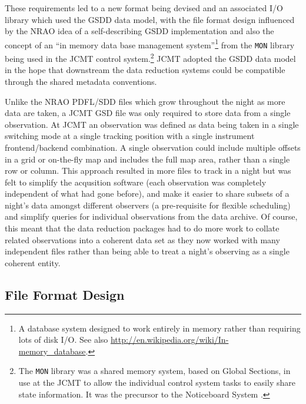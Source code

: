 \documentclass[final,authoryear,5p,times,twocolumn]{elsarticle}
\begin{document}
These requirements led to a new format being devised and an associated
I/O library which used the GSDD data model, with the file format
design influenced by the NRAO idea of a self-describing GSDD
implementation and also the concept of an ``in memory data base
management system''\footnote{A database system designed to work
  entirely in memory rather than requiring lots of disk I/O. See also
  \url{http://en.wikipedia.org/wiki/In-memory_database}.} from the
\texttt{MON} library being used in the JCMT control
system.\footnote{The \texttt{MON} library was a shared memory system,
  based on Global Sections, in use at the JCMT to allow the individual
  control system tasks to easily share state information. It was the
  precursor to the Noticeboard System \citep[NBS;][]{SUN77}.}  JCMT
adopted the GSDD data model in the hope that downstream the data
reduction systems could be compatible through the shared metadata
conventions.

Unlike the NRAO PDFL/SDD files which grow throughout the night as more
data are taken, a JCMT GSD file was only required to store data from a
single observation. At JCMT an observation was defined as data being
taken in a single switching mode at a single tracking position with a
single instrument frontend/backend combination. A single observation
could include multiple offsets in a grid or on-the-fly map and
includes the full map area, rather than a single row or column. This
approach resulted in more files to track in a night but was felt to
simplify the acqusition software (each observation was completely
independent of what had gone before), and make it easier to share
subsets of a night's data amongst different observers (a pre-requisite
for flexible scheduling) and simplify queries for individual
observations from the data archive. Of course, this meant that the
data reduction packages had to do more work to collate related
observations into a coherent data set as they now worked with many
independent files rather than being able to treat a night's observing
as a single coherent entity.

\subsection{File Format Design}
\end{document}
